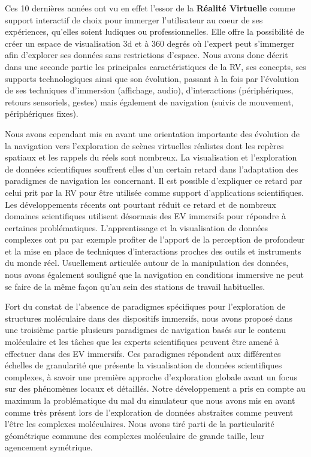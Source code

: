 
Ces 10 dernières années ont vu en effet l'essor de la \textbf{Réalité Virtuelle} comme support interactif de choix pour immerger l'utilisateur au coeur de ses expériences, qu'elles soient ludiques ou professionnelles. Elle offre la possibilité de créer un espace de visualisation 3d et à 360 degrés où l'expert peut s'immerger afin d'explorer ses données sans restrictions d'espace. Nous avons donc décrit dans une seconde partie les principales caractéristiques de la RV, ses concepts, ses supports technologiques ainsi que son évolution, passant à la fois par l'évolution de ses techniques d'immersion (affichage, audio), d'interactions (périphériques, retours sensoriels, gestes) mais également de navigation (suivis de mouvement, périphériques fixes). 

Nous avons cependant mis en avant une orientation importante des évolution de la navigation vers l'exploration de scènes virtuelles réalistes dont les repères spatiaux et les rappels du réels sont nombreux. La visualisation et l'exploration de données scientifiques souffrent elles d'un certain retard dans l'adaptation des paradigmes de navigation les concernant. Il est possible d'expliquer ce retard par celui prit par la RV pour être utilisée comme support d'applications scientifiques. Les développements récents ont pourtant réduit ce retard et de nombreux domaines scientifiques utilisent désormais des EV immersifs pour répondre à certaines problématiques. L'apprentissage et la visualisation de données complexes ont pu par exemple profiter de l'apport de la perception de profondeur et la mise en place de techniques d'interactions proches des outils et instruments du monde réel. Usuellement articulée autour de la manipulation des données, nous avons également souligné que la navigation en conditions immersive ne peut se faire de la même façon qu'au sein des stations de travail habituelles. 



Fort du constat de l'absence de paradigmes spécifiques pour l'exploration de structures moléculaire dans des dispositifs immersifs, nous avons proposé dans une troisième partie plusieurs paradigmes de navigation basés sur le contenu moléculaire et les tâches que les experts scientifiques peuvent être amené à effectuer dans des EV immersifs. Ces paradigmes répondent aux différentes échelles de granularité que présente la visualisation de données scientifiques complexes, à savoir une première approche d'exploration globale avant un focus sur des phénomènes locaux et détaillés. Notre développement a pris en compte au maximum la problématique du mal du simulateur que nous avons mis en avant comme très présent lors de l'exploration de données abstraites comme peuvent l'être les complexes moléculaires. Nous avons tiré parti de la particularité géométrique commune des complexes moléculaire de grande taille, leur agencement symétrique.

